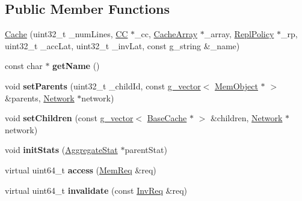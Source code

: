 \subsection*{Public Member Functions}
\begin{DoxyCompactItemize}
\item 
\hyperlink{classCache_a398112ee381973ef3777746a31900320}{Cache} (uint32\-\_\-t \-\_\-num\-Lines, \hyperlink{classCC}{C\-C} $\ast$\-\_\-cc, \hyperlink{classCacheArray}{Cache\-Array} $\ast$\-\_\-array, \hyperlink{classReplPolicy}{Repl\-Policy} $\ast$\-\_\-rp, uint32\-\_\-t \-\_\-acc\-Lat, uint32\-\_\-t \-\_\-inv\-Lat, const g\-\_\-string \&\-\_\-name)
\item 
\hypertarget{classCache_a723ba68ec1f3e8d46b536e003d2d31d4}{const char $\ast$ {\bfseries get\-Name} ()}\label{classCache_a723ba68ec1f3e8d46b536e003d2d31d4}

\item 
\hypertarget{classCache_a79ba01ab96d6949c8cf3f71cf310d9bd}{void {\bfseries set\-Parents} (uint32\-\_\-t \-\_\-child\-Id, const \hyperlink{classg__vector}{g\-\_\-vector}$<$ \hyperlink{classMemObject}{Mem\-Object} $\ast$ $>$ \&parents, \hyperlink{classNetwork}{Network} $\ast$network)}\label{classCache_a79ba01ab96d6949c8cf3f71cf310d9bd}

\item 
\hypertarget{classCache_a5c6c05094ed04256fd6f77a3ca20673e}{void {\bfseries set\-Children} (const \hyperlink{classg__vector}{g\-\_\-vector}$<$ \hyperlink{classBaseCache}{Base\-Cache} $\ast$ $>$ \&children, \hyperlink{classNetwork}{Network} $\ast$network)}\label{classCache_a5c6c05094ed04256fd6f77a3ca20673e}

\item 
\hypertarget{classCache_a3cd51a37ecac027028c662279fed96e3}{void {\bfseries init\-Stats} (\hyperlink{classAggregateStat}{Aggregate\-Stat} $\ast$parent\-Stat)}\label{classCache_a3cd51a37ecac027028c662279fed96e3}

\item 
\hypertarget{classCache_a7d23c3978dca10511edbfba724489a14}{virtual uint64\-\_\-t {\bfseries access} (\hyperlink{structMemReq}{Mem\-Req} \&req)}\label{classCache_a7d23c3978dca10511edbfba724489a14}

\item 
\hypertarget{classCache_a2b21fdc8a63f1c1a60b84643debe82db}{virtual uint64\-\_\-t {\bfseries invalidate} (const \hyperlink{structInvReq}{Inv\-Req} \&req)}\label{classCache_a2b21fdc8a63f1c1a60b84643debe82db}

\end{DoxyCompactItemize}
